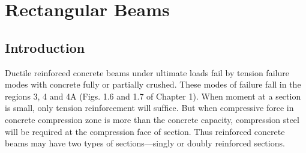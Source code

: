 \chapter{Rectangular Beams}
\section{Introduction}Ductile reinforced concrete beams under ultimate loads fail by tension failure modes with
concrete fully or partially crushed. These modes of failure fall in the regions 3, 4 and 4A
(Figs. 1.6 and 1.7 of Chapter 1). When moment at a section is small, only tension reinforcement
will sufﬁce. But when compressive force in concrete compression zone is more than the concrete
capacity, compression steel will be required at the compression face of section. Thus reinforced
concrete beams may have two types of sections—singly or doubly reinforced sections.

